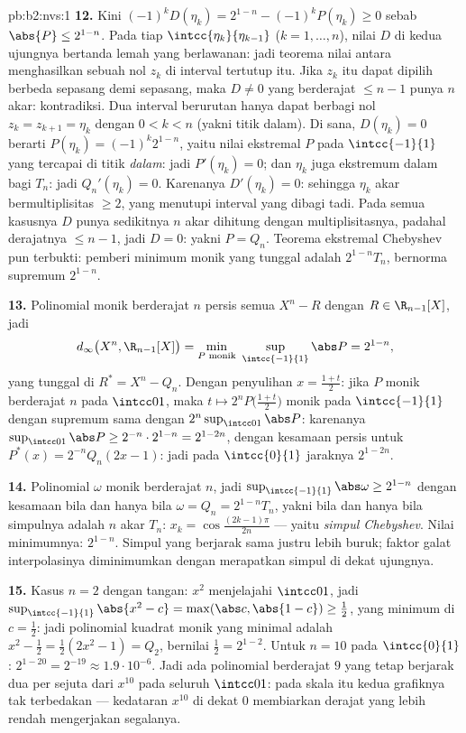 \begin{solution}{pb:b2:nvs:1}
\textbf{12.} Kini $(-1)^kD(\eta_k) = 2^{1-n} - (-1)^kP(\eta_k)
\geq 0$ sebab $\abs{P} \leq 2^{1-n}$. Pada tiap
$\intcc{\eta_k}{\eta_{k-1}}$ ($k = 1, \dots, n$), nilai $D$ di kedua
ujungnya bertanda lemah yang berlawanan: jadi teorema nilai antara
menghasilkan sebuah nol $z_k$ di interval tertutup itu. Jika $z_k$ itu
dapat dipilih berbeda sepasang demi sepasang, maka $D \neq 0$ yang
berderajat $\leq n-1$ punya $n$ akar: kontradiksi. Dua interval berurutan
hanya dapat berbagi nol $z_k = z_{k+1} = \eta_k$ dengan $0 < k < n$
(yakni titik dalam). Di sana, $D(\eta_k) = 0$ berarti $P(\eta_k) =
(-1)^k2^{1-n}$, yaitu nilai ekstremal $P$ pada $\intcc{-1}{1}$ yang
tercapai di titik \emph{dalam}: jadi $P'(\eta_k) = 0$; dan
$\eta_k$ juga ekstremum dalam bagi $T_n$: jadi $Q_n'(\eta_k) =
0$. Karenanya $D'(\eta_k) = 0$: sehingga $\eta_k$ akar bermultiplisitas
$\geq 2$, yang menutupi interval yang dibagi tadi. Pada semua kasusnya
$D$ punya sedikitnya $n$ akar dihitung dengan multiplisitasnya, padahal
derajatnya $\leq n - 1$, jadi $D = 0$: yakni $P = Q_n$. Teorema ekstremal
Chebyshev pun terbukti: pemberi minimum monik yang tunggal adalah
$2^{1-n}T_n$, bernorma supremum $2^{1-n}$.

\textbf{13.} Polinomial monik berderajat $n$ persis semua
$X^n - R$ dengan $R \in \R_{n-1}[X]$, jadi
\[
d_\infty\bigl(X^n, \R_{n-1}[X]\bigr) = \min_{P \text{
monik}}\ \sup_{\intcc{-1}{1}}\abs P = 2^{1-n},
\]
yang tunggal di $R^* = X^n - Q_n$. Dengan penyulihan $x = \frac{1+t}2$:
jika $P$ monik berderajat $n$ pada $\intcc01$, maka $t \mapsto
2^nP\bigl(\frac{1+t}2\bigr)$ monik pada $\intcc{-1}{1}$ dengan
supremum sama dengan $2^n\sup_{\intcc01}\abs P$: karenanya
$\sup_{\intcc01}\abs P \geq 2^{-n}\cdot2^{1-n} = 2^{1-2n}$, dengan
kesamaan persis untuk $P^*(x) = 2^{-n}Q_n(2x - 1)$: jadi pada
$\intcc{0}{1}$ jaraknya $2^{1-2n}$.

\textbf{14.} Polinomial $\omega$ monik berderajat $n$, jadi
$\sup_{\intcc{-1}{1}}\abs\omega \geq 2^{1-n}$ dengan kesamaan bila dan
hanya bila $\omega = Q_n = 2^{1-n}T_n$, yakni bila dan hanya bila
simpulnya adalah $n$ akar $T_n$: $x_k = \cos\frac{(2k-1)\pi}{2n}$ ---
yaitu \emph{simpul Chebyshev}. Nilai minimumnya: $2^{1-n}$. Simpul yang
berjarak sama justru lebih buruk; faktor galat interpolasinya diminimumkan
dengan merapatkan simpul di dekat ujungnya.

\textbf{15.} Kasus $n = 2$ dengan tangan: $x^2$ menjelajahi $\intcc01$,
jadi $\sup_{\intcc{-1}{1}}\abs{x^2 - c} = \max(\abs c, \abs{1 - c})
\geq \frac12$, yang minimum di $c = \frac12$: jadi polinomial kuadrat
monik yang minimal adalah $x^2 - \frac12 = \frac12(2x^2 - 1) = Q_2$,
bernilai $\frac12 = 2^{1-2}$. Untuk $n = 10$ pada $\intcc{0}{1}$: $2^{1-20} =
2^{-19} \approx 1.9\cdot10^{-6}$. Jadi ada polinomial berderajat $9$
yang tetap berjarak dua per sejuta dari $x^{10}$ pada seluruh
$\intcc01$: pada skala itu kedua grafiknya tak terbedakan
--- kedataran $x^{10}$ di dekat $0$ membiarkan derajat yang lebih rendah
mengerjakan segalanya.


\end{solution}

